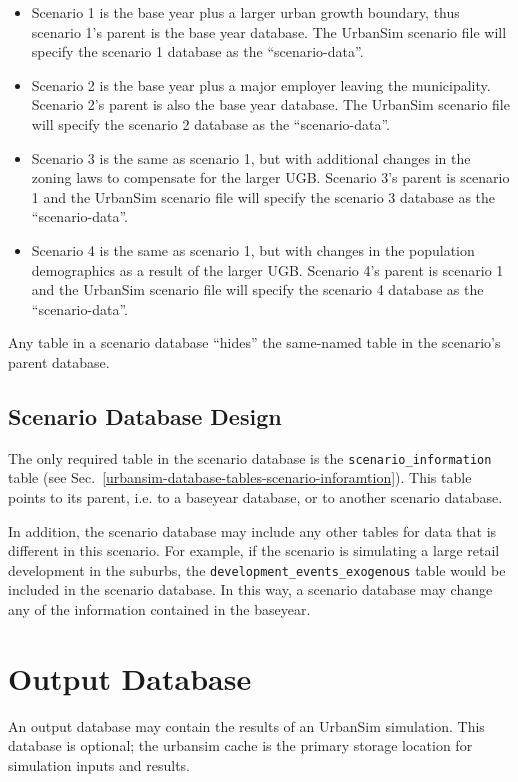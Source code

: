 \begin{itemize}
\item Scenario 1 is the base year plus a larger urban growth boundary, thus
scenario 1's parent is the base year database. The UrbanSim scenario file will
specify the scenario 1 database as the ``scenario-data''.
\item Scenario 2 is the base year plus a major employer leaving the
municipality. Scenario 2's parent is also the base year database. The UrbanSim
scenario file will specify the scenario 2 database as the ``scenario-data''.
\item Scenario 3 is the same as scenario 1, but with additional changes in the
zoning laws to compensate for the larger UGB. Scenario 3's parent is scenario 1
and the UrbanSim scenario file will specify the scenario 3 database as the
``scenario-data''.
\item Scenario 4 is the same as scenario 1, but with changes in the population
demographics as a result of the larger UGB. Scenario 4's parent is scenario 1
and the UrbanSim scenario file will specify the scenario 4 database as the
``scenario-data''.
\end{itemize}

Any table in a scenario database ``hides'' the same-named table in the
scenario's parent database.

\subsection{Scenario Database Design}

The only required table in the scenario database is the
\verb|scenario_information| table (see Sec.~\ref{urbansim-database-tables-scenario-inforamtion}).
This table points to its parent, i.e. to a baseyear database, or
to another scenario database.

In addition, the scenario database may include any other tables for data that
is different in this scenario. For example, if the scenario is simulating a
large retail development in the suburbs, the \verb|development_events_exogenous| table
would be included in the scenario database.  In this way, a scenario database
may change any of the information contained in the baseyear.

\section{Output Database}

An output database may contain the results of an UrbanSim simulation.  This
database is optional; the urbansim cache is the primary storage location for
simulation inputs and results.

